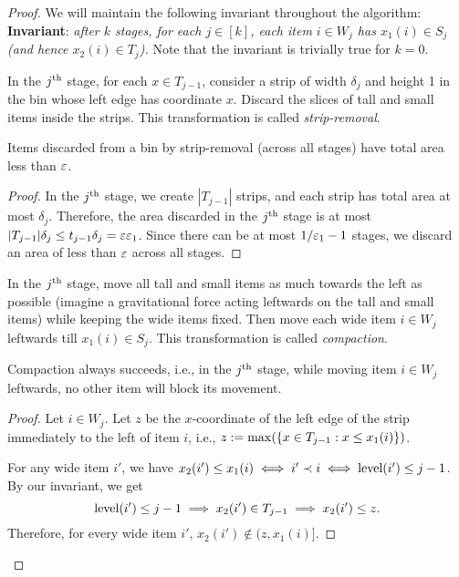 \begin{proof}
We will maintain the following invariant throughout the algorithm:\\
\textbf{Invariant}: \textsl{after $k$ stages, for each $j \in [k]$,
each item $i \in W_j$ has $x_1(i) \in S_j$ (and hence $x_2(i) \in T_j$).}
Note that the invariant is trivially true for $k=0$.

\begin{definition}
In the $j^{\textrm{th}}$ stage, for each $x \in T_{j-1}$,
consider a strip of width $\delta_j$ and height 1 in the bin
whose left edge has coordinate $x$.
Discard the slices of tall and small items inside the strips.
This transformation is called \emph{strip-removal}.
\end{definition}

\begin{lemma}
Items discarded from a bin by strip-removal (across all stages)
have total area less than $\varepsilon$.
\end{lemma}
\begin{proof}
In the $j^{\textrm{th}}$ stage, we create $|T_{j-1}|$ strips,
and each strip has total area at most $\delta_j$.
Therefore, the area discarded in the $j^{\textrm{th}}$ stage is at most
$|T_{j-1}|\delta_j \le t_{j-1}\delta_j = \varepsilon\varepsilon_1$.
Since there can be at most $1/\varepsilon_1-1$ stages,
we discard an area of less than $\varepsilon$ across all stages.
\end{proof}

\begin{definition}[Compaction]
In the $j^{\textrm{th}}$ stage, move all tall and small items as much towards the left as possible
(imagine a gravitational force acting leftwards on the tall and small items)
while keeping the wide items fixed.
Then move each wide item $i \in W_j$ leftwards till $x_1(i) \in S_j$.
This transformation is called \emph{compaction}.
\end{definition}

\begin{lemma}
Compaction always succeeds, i.e., in the $j^{\textrm{th}}$ stage, while moving
item $i \in W_j$ leftwards, no other item will block its movement.
\end{lemma}
\begin{proof}
Let $i \in W_j$. Let $z$ be the $x$-coordinate of the left edge of the strip
immediately to the left of item $i$, i.e.,
$z := \max(\{x \in T_{j-1}: x \le x_1(i)\})$.

For any wide item $i'$, we have $x_2(i') \le x_1(i) \iff i' \prec i \iff \operatorname{level}(i') \le j-1$.
By our invariant, we get
\[ \operatorname{level}(i') \le j-1 \implies x_2(i') \in T_{j-1} \implies x_2(i') \le z. \]
Therefore, for every wide item $i'$, $x_2(i') \not\in (z, x_1(i)]$.


\end{proof}
\end{proof}
